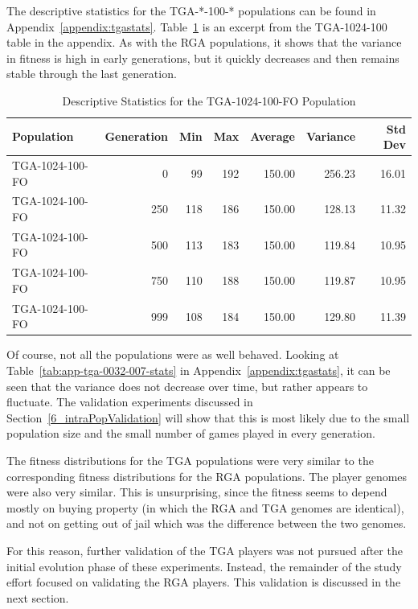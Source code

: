 The descriptive statistics for the TGA-*-100-* populations can be found in
Appendix~\ref{appendix:tgastats}. Table~\ref{tab:tga-1024-100-fo-stats} is an
excerpt from the TGA-1024-100 table in the appendix. As with the RGA
populations, it shows that the variance in fitness is high in early generations,
but it quickly decreases and then remains stable through the last generation.

\begin{table}[htbp]
  \centering
  \caption[TGA-1024-100-FO Statistics]{Descriptive Statistics for the TGA-1024-100-FO Population}
    \begin{tabular}{lrrrrrr}
    \toprule
    Population &  Generation & Min    & Max    & Average & Variance & Std Dev \\
    \midrule
    TGA-1024-100-FO & 0      & 99     & 192    & 150.00 & 256.23 & 16.01 \\
    TGA-1024-100-FO & 250    & 118    & 186    & 150.00 & 128.13 & 11.32 \\
    TGA-1024-100-FO & 500    & 113    & 183    & 150.00 & 119.84 & 10.95 \\
    TGA-1024-100-FO & 750    & 110    & 188    & 150.00 & 119.87 & 10.95 \\
    TGA-1024-100-FO & 999    & 108    & 184    & 150.00 & 129.80 & 11.39 \\
    \bottomrule
    \end{tabular}
  \label{tab:tga-1024-100-fo-stats}%
\end{table}%

Of course, not all the populations were as well behaved. Looking at
Table~\ref{tab:app-tga-0032-007-stats} in Appendix~\ref{appendix:tgastats}, it
can be seen that the variance does not decrease over time, but rather appears to
fluctuate. The validation experiments discussed in
Section~\ref{6_intraPopValidation} will show that this is most likely due to the
small population size and the small number of games played in every generation.

The fitness distributions for the TGA populations were very similar to the
corresponding fitness distributions for the RGA populations. The player genomes
were also very similar. This is unsurprising, since the fitness seems to depend
mostly on buying property (in which the RGA and TGA genomes are identical), and
not on getting out of jail which was the difference between the two genomes.

For this reason, further validation of the TGA players was not pursued after
the initial evolution phase of these experiments. Instead, the remainder of the
study effort focused on validating the RGA players. This validation is discussed
in the next section.

